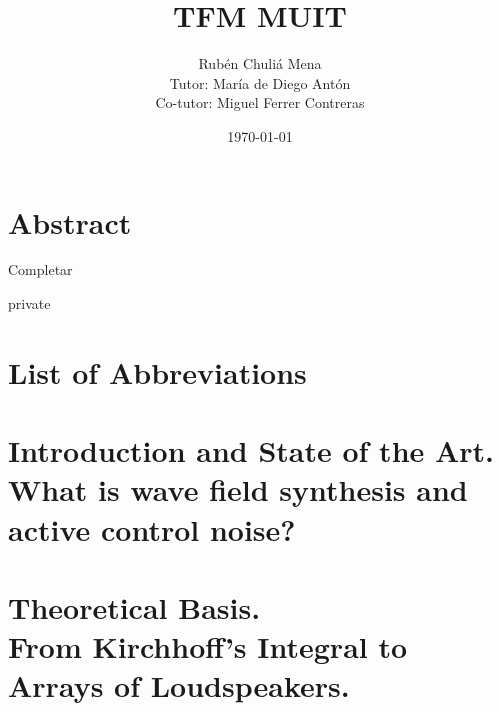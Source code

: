\documentclass[11pt,a4paper]{report}
\providecommand\phantomsection{}
\newcommand{\TexFolder}{Tex/}
\begin{document}
\author{
	Rub\'{e}n Chuli\'{a} Mena \\
	Tutor: Mar\'ia de Diego Ant\'on \\
	Co-tutor: Miguel Ferrer Contreras
}
\title{TFM MUIT}
\date{\today}
\maketitle
{}

\phantomsection %
\tableofcontents

\newpage

\phantomsection
{}
\chapter*{Abstract}
Completar

\newpage

\phantomsection
\listoffigures

\newpage

\begin{shownto}{private}
\phantomsection
{}
\chapter*{List of Abbreviations}

\end{shownto}

\newpage
\setcounter{page}{1}

\chapter[Introduction and State of the Art]{Introduction and State of the Art.\\What is wave field synthesis and active control noise?}


\chapter[Theoretical Basis]{Theoretical Basis.\\From Kirchhoff's Integral to Arrays of Loudspeakers.}\label{chapterWFStheory}



\end{document}

